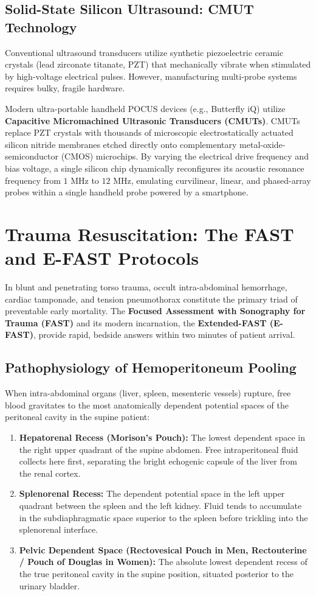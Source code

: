 \documentclass[11pt,a4paper]{article}
\begin{document}
\subsection{Solid-State Silicon Ultrasound: CMUT Technology}
Conventional ultrasound transducers utilize synthetic piezoelectric ceramic crystals (lead zirconate titanate, PZT) that mechanically vibrate when stimulated by high-voltage electrical pulses. However, manufacturing multi-probe systems requires bulky, fragile hardware.

Modern ultra-portable handheld POCUS devices (e.g., Butterfly iQ) utilize \textbf{Capacitive Micromachined Ultrasonic Transducers (CMUTs)}. CMUTs replace PZT crystals with thousands of microscopic electrostatically actuated silicon nitride membranes etched directly onto complementary metal-oxide-semiconductor (CMOS) microchips. By varying the electrical drive frequency and bias voltage, a single silicon chip dynamically reconfigures its acoustic resonance frequency from $1\text{ MHz}$ to $12\text{ MHz}$, emulating curvilinear, linear, and phased-array probes within a single handheld probe powered by a smartphone.

\section{Trauma Resuscitation: The FAST and E-FAST Protocols}
In blunt and penetrating torso trauma, occult intra-abdominal hemorrhage, cardiac tamponade, and tension pneumothorax constitute the primary triad of preventable early mortality. The \textbf{Focused Assessment with Sonography for Trauma (FAST)} and its modern incarnation, the \textbf{Extended-FAST (E-FAST)}, provide rapid, bedside answers within two minutes of patient arrival.

\subsection{Pathophysiology of Hemoperitoneum Pooling}
When intra-abdominal organs (liver, spleen, mesenteric vessels) rupture, free blood gravitates to the most anatomically dependent potential spaces of the peritoneal cavity in the supine patient:
\begin{enumerate}
    \item \textbf{Hepatorenal Recess (Morison's Pouch):} The lowest dependent space in the right upper quadrant of the supine abdomen. Free intraperitoneal fluid collects here first, separating the bright echogenic capsule of the liver from the renal cortex.
    \item \textbf{Splenorenal Recess:} The dependent potential space in the left upper quadrant between the spleen and the left kidney. Fluid tends to accumulate in the subdiaphragmatic space superior to the spleen before trickling into the splenorenal interface.
    \item \textbf{Pelvic Dependent Space (Rectovesical Pouch in Men, Rectouterine / Pouch of Douglas in Women):} The absolute lowest dependent recess of the true peritoneal cavity in the supine position, situated posterior to the urinary bladder.
\end{enumerate}
\end{document}
